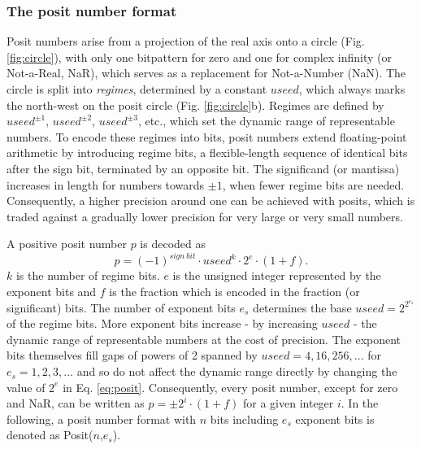 \documentclass[draft]{agujournal2019}
\begin{document}
\subsubsection{The posit number format}
\label{sec:posit_methods}

Posit numbers arise from a projection of the real axis onto a circle (Fig. \ref{fig:circle}), with only one bitpattern for zero and one for complex infinity (or Not-a-Real, NaR), which serves as a replacement for Not-a-Number (NaN). The circle is split into \emph{regimes}, determined by a constant $useed$, which always marks the north-west on the posit circle (Fig. \ref{fig:circle}b). Regimes are defined by $useed^{\pm1}$, $useed^{\pm2}$, $useed^{\pm3}$, etc., which set the dynamic range of representable numbers. To encode these regimes into bits, posit numbers extend floating-point arithmetic by introducing regime bits, a flexible-length sequence of identical bits after the sign bit, terminated by an opposite bit. The significand (or mantissa) increases in length for numbers towards $\pm1$, when fewer regime bits are needed. Consequently, a higher precision around one can be achieved with posits, which is traded against a gradually lower precision for very large or very small numbers.

A positive posit number $p$ is decoded as \cite{Gustafson2017,Gustafson2017a,Chen2018,Klower2019}
\begin{equation}
p = (-1)^{sign~bit} \cdot useed^k \cdot 2^e \cdot (1+f).
\label{eq:posit}
\end{equation}
$k$ is the number of regime bits. $e$ is the unsigned integer represented by the exponent bits and $f$ is the fraction which is encoded in the fraction (or significant) bits. The number of exponent bits $e_s$ determines the base $useed = 2^{2^{e_s}}$ of the regime bits. More exponent bits increase - by increasing $useed$ - the dynamic range of representable numbers at the cost of precision. The exponent bits themselves fill gaps of powers of 2 spanned by $useed = 4,16,256,...$ for $e_s=1,2,3,...$ and so do not affect the dynamic range directly by changing the value of $2^e$ in Eq. \ref{eq:posit}. Consequently, every posit number, except for zero and NaR, can be written as $p = \pm 2^i \cdot (1+f)$ for a given integer $i$. In the following, a posit number format with $n$ bits including $e_s$ exponent bits is denoted as Posit($n$,$e_s$).
\end{document}
